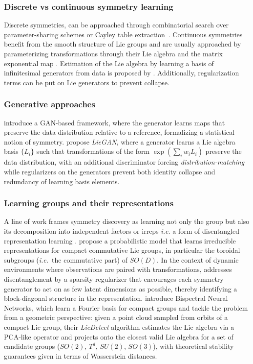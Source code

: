 \documentclass[mathematics,review,submit,moreauthors]{Definitions/mdpi}
\begin{document}
\subsubsection{Discrete vs continuous symmetry learning}
Discrete symmetries, can be approached through combinatorial search over parameter-sharing schemes \citep{yeh2022p2icais,zhou2021} or Cayley table extraction~\citep{sanborn2022}.
Continuous symmetries benefit from the smooth structure of Lie groups and are usually approached by parameterizing transformations through their Lie algebra and the matrix exponential map \citep{benton2020anips,ouderaa2022}.
Estimation of the Lie algebra by learning a basis of infinitesimal generators from data is proposed by  \citet{dehmamy2021anips,yang2023p4icml}.
Additionally, regularization terms can be put on Lie generators \citep{escriche2025} to prevent collapse.

\subsubsection{Generative approaches}
\citet{desai2022prd} introduce a GAN-based framework, where the generator learns maps that preserve the data distribution relative to a reference, formalizing a statistical notion of symmetry.
\citet{yang2023p4icml} propose \textit{LieGAN}, where a generator learns a Lie algebra basis $\{L_i\}$ such that transformations of the form $\exp(\sum_i w_i L_i)$ preserve the data distribution, with an additional discriminator forcing \textit{distribution-matching} while regularizers on the generators prevent both identity collapse and redundancy of learning basis elements.

\subsubsection{Learning groups and their representations}
A line of work frames symmetry discovery as learning not only the group but also its decomposition into independent factors or irreps \textit{i.e.} a form of disentangled representation learning \citep{higgins2018}.
\citet{cohen2014} propose a probabilistic model that learns irreducible representations for compact commutative Lie groups, in particular the toroidal subgroups (\textit{i.e.}\ the commutative part) of $SO(D)$.
In the context of dynamic environments where observations are paired with transformations, \citet{quessard2020anips} addresses disentanglement by a sparsity regularizer that encourages each symmetry generator to act on as few latent dimensions as possible, thereby identifying a block-diagonal structure in the representation.
\citet{sanborn2022} introduce Bispectral Neural Networks, which learn a Fourier basis for compact groups and \citet{ennes2025fcm} tackle the problem from a geometric perspective: given a point cloud sampled from orbits of a compact Lie group, their \textit{LieDetect} algorithm estimates the Lie algebra via a PCA-like operator and projects onto the closest valid Lie algebra for a set of candidate groups ($SO(2)$, $T^d$, $SU(2)$, $SO(3)$), with theoretical stability guarantees given in terms of Wasserstein distances.
\end{document}

